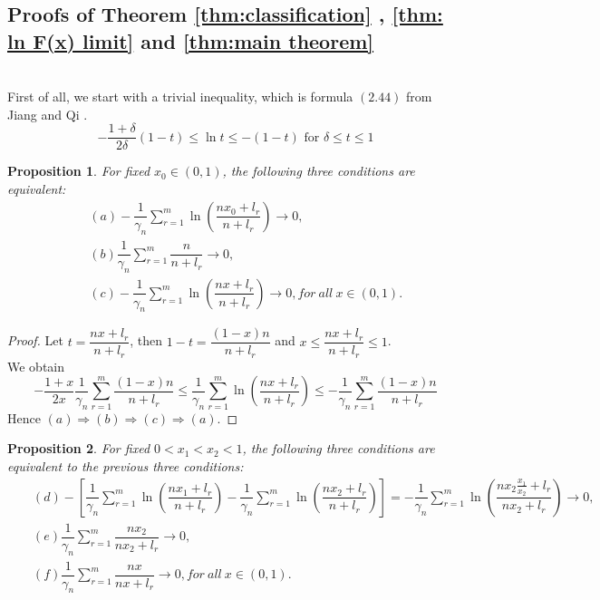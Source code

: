 \documentclass[12pt]{article}
\theoremstyle{plain}
\newtheorem{prop}{Proposition}[section]
\theoremstyle{definition}
\theoremstyle{remark}
\begin{document}
\subsection*{Proofs of Theorem \ref{thm:classification} , \ref{thm: ln F(x) limit} and \ref{thm:main theorem}}
\ \\
	First of all, we start with a trivial inequality, which is formula $(2.44)$ from Jiang and Qi \cite{JiangQi2019}. 
	\begin{equation} \label{inequality} 
	-\frac{1+\delta}{2 \delta}(1-t) \leq \ln t \leq-(1-t) \text { for } \delta \leq t \leq 1
	\end{equation}
\begin{prop}
	For fixed $x_0\in (0,1)$,
the following three conditions are equivalent:
\begin{eqnarray*}
&&(a) -\dfrac{1}{\gamma_{n}}\sum_{r=1}^{m}\ln(\dfrac{nx_0+l_r}{n+l_r})\to 0,\\
&&(b) \dfrac{1}{\gamma_{n}}\sum_{r=1}^{m}\dfrac{n}{n+l_r}\to 0,\\
&&(c)-\dfrac{1}{\gamma_{n}}\sum_{r=1}^{m}\ln(\dfrac{nx+l_r}{n+l_r})\to 0, for\ all\ x\in (0,1).
\end{eqnarray*}
\end{prop}
\begin{proof}
Let $t=\dfrac{nx+l_r}{n+l_r}$, then $1-t=\dfrac{(1-x)n}{n+l_r}$ and $x\leq \dfrac{nx+l_r}{n+l_r}\leq 1$.\\
We obtain 
\begin{equation}\label{ineq}
-\frac{1+x}{2 x}\dfrac{1}{\gamma_{n}}\sum_{r=1}^{m}\dfrac{(1-x)n}{n+l_r} \leq  \dfrac{1}{\gamma_{n}}\sum_{r=1}^{m}\ln(\dfrac{nx+l_r}{n+l_r}) \leq-\dfrac{1}{\gamma_{n}}\sum_{r=1}^{m}\dfrac{(1-x)n}{n+l_r}
\end{equation}
Hence $(a)\Rightarrow (b)\Rightarrow (c)\Rightarrow (a)$.
\end{proof}
\begin{prop}
	For fixed $0<x_1<x_2<1$,
	the following three conditions are equivalent to the previous three conditions:
\begin{eqnarray*}
&&(d) -[\dfrac{1}{\gamma_{n}}\sum_{r=1}^{m}\ln(\dfrac{nx_1+l_r}{n+l_r})-\dfrac{1}{\gamma_{n}}\sum_{r=1}^{m}\ln(\dfrac{nx_2+l_r}{n+l_r})]=-\dfrac{1}{\gamma_{n}}\sum_{r=1}^{m}\ln(\dfrac{nx_2\frac{x_1}{x_2}+l_r}{nx_2+l_r})\to 0,\\
&&(e) \dfrac{1}{\gamma_{n}}\sum_{r=1}^{m}\dfrac{nx_2}{nx_2+l_r}\to 0,\\
&&(f) \dfrac{1}{\gamma_{n}}\sum_{r=1}^{m}\dfrac{nx}{nx+l_r}\to 0, for\ all\ x\in (0,1).
\end{eqnarray*}
\end{prop}
\end{document}
